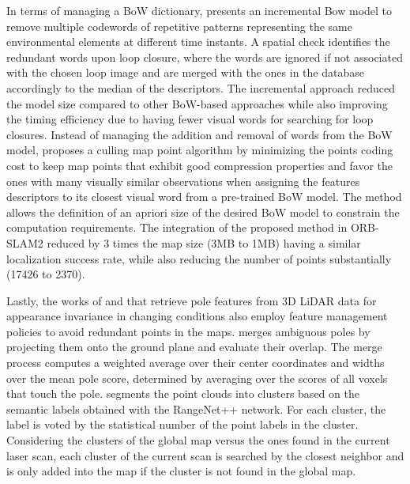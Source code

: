 In terms of managing a BoW dictionary, \cite{tsintotas-et-al:2021:103782} presents an incremental Bow model to remove multiple codewords of repetitive patterns representing the same environmental elements at different time instants. A spatial check identifies the redundant words upon loop closure, where the words are ignored if not associated with the chosen loop image and are merged with the ones in the database accordingly to the median of the descriptors. The incremental approach reduced the model size compared to other BoW-based approaches while also improving the timing efficiency due to having fewer visual words for searching for loop closures.
Instead of managing the addition and removal of words from the BoW model, \cite{opdenbosch-et-al:2018:00114} proposes a culling map point algorithm by minimizing the points coding cost to keep map points that exhibit good compression properties and favor the ones with many visually similar observations when assigning the features descriptors to its closest visual word from a pre-trained BoW model. The method allows the definition of an apriori size of the desired BoW model to constrain the computation requirements. The integration of the proposed method in ORB-SLAM2 reduced by 3 times the map size (3MB to 1MB) having a similar localization success rate, while also reducing the number of points substantially (17426 to 2370). 

Lastly, the works of \cite{schaefer-et-al:2021:103709} and \cite{wang-et-al:2021:9739599} that retrieve pole features from 3D LiDAR data for appearance invariance in changing conditions also employ feature management policies to avoid redundant points in the maps.
\cite{schaefer-et-al:2021:103709} merges ambiguous poles by projecting them onto the ground plane and evaluate their overlap. The merge process computes a weighted average over their center coordinates and widths over the mean pole score, determined by averaging over the scores of all voxels that touch the pole.
\cite{wang-et-al:2021:9739599} segments the point clouds into clusters based on the semantic labels obtained with the RangeNet++ network. For each cluster, the label is voted by the statistical number of the point labels in the cluster. Considering the clusters of the global map versus the ones found in the current laser scan, each cluster of the current scan is searched by the closest neighbor and is only added into the map if the cluster is not found in the global map.






